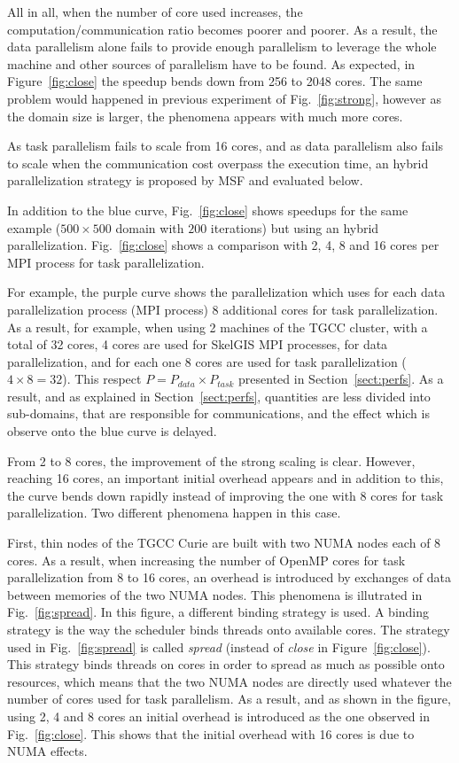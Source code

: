 All in all, when the number of core used increases, the computation/communication ratio becomes poorer and poorer. As a result, the data parallelism alone fails to provide enough parallelism to leverage the whole machine and other sources of parallelism have to be found. As expected, in  Figure~\ref{fig:close} the speedup bends down from 256 to 2048 cores. The same problem would happened in previous experiment of Fig.~\ref{fig:strong}, however as the domain size is larger, the phenomena appears with much more cores. 

As task parallelism fails to scale from 16 cores, and as data parallelism also fails to scale when the communication cost overpass the execution time, an hybrid parallelization strategy is proposed by MSF and evaluated below.

In addition to the blue curve, Fig.~\ref{fig:close} shows speedups for the same example ($500 \times 500$ domain with $200$ iterations) but using an hybrid parallelization. Fig.~\ref{fig:close} shows a comparison with 2, 4, 8 and 16 cores per MPI process for task parallelization.

For example, the purple curve shows the parallelization which uses for each data parallelization process (\ie MPI process) 8 additional cores for task parallelization. As a result, for example, when using 2 machines of the TGCC cluster, with a total of 32 cores, 4 cores are used for SkelGIS MPI processes, for data parallelization, and for each one 8 cores are used for task parallelization ($4 \times 8 = 32$). This respect $P = P_{data} \times P_{task}$ presented in Section~\ref{sect:perfs}.
As a result, and as explained in Section~\ref{sect:perfs}, quantities are less divided into sub-domains, that are responsible for communications, and the effect which is observe onto the blue curve is delayed.

From 2 to 8 cores, the improvement of the strong scaling is clear. However, reaching 16 cores, an important initial overhead appears and in addition to this, the curve bends down rapidly instead of improving the one with 8 cores for task parallelization. Two different phenomena happen in this case.

First, thin nodes of the TGCC Curie are built with two NUMA nodes each of 8 cores. As a result, when increasing the number of OpenMP cores for task parallelization from 8 to 16 cores, an overhead is introduced by exchanges of data between memories of the two NUMA nodes. This phenomena is illutrated in Fig.~\ref{fig:spread}. In this figure, a different binding strategy is used. A binding strategy is the way the scheduler binds threads onto available cores. The strategy used in Fig.~\ref{fig:spread} is called \emph{spread} (instead of \emph{close} in Figure~\ref{fig:close}). This strategy binds threads on cores in order to spread as much as possible onto resources, which means that the two NUMA nodes are directly used whatever the number of cores used for task parallelism. As a result, and as shown in the figure, using 2, 4 and 8 cores an initial overhead is introduced as the one observed in Fig.~\ref{fig:close}. This shows that the initial overhead with 16 cores is due to NUMA effects.

